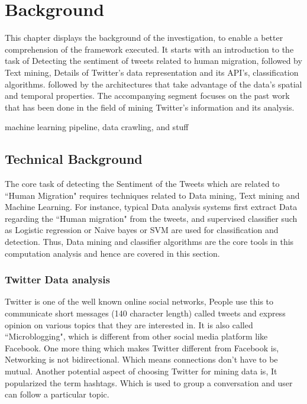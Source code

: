 \chapter{Background}\label{chap:background}
This chapter displays the background of the investigation, to enable a better comprehension of the framework executed. It starts with an introduction to the task of Detecting the sentiment of tweets related to human migration, followed by Text mining, Details of Twitter's data representation and its API's, classification algorithms. followed by the architectures that take advantage of the data’s spatial and temporal properties. The accompanying segment focuses on the past work that has been done in the field of mining Twitter's information and its analysis.

machine learning pipeline, data crawling, and stuff
    
\section{Technical Background}

The core task of detecting the Sentiment of the Tweets which are related to ``Human Migration" requires techniques related to Data mining, Text mining and Machine Learning. For instance, typical Data analysis systems first extract Data regarding the ``Human migration" from the tweets, and supervised classifier such as Logistic regression or Naive bayes or SVM  are used for classification and detection. Thus, Data mining and classifier algorithms are the core tools in this computation analysis and hence are covered in this section.

\subsection{Twitter Data analysis}

Twitter is one of the well known online social networks, People use this to communicate short messages (140 character length) called tweets and express opinion on various topics that they are interested in. It is also called ``Microblogging", which is different from other social media platform like Facebook. One more thing which makes Twitter different from Facebook is, Networking is not bidirectional. Which means connections don't have to be mutual. Another  potential aspect of choosing Twitter for mining data is, It popularized the term hashtags. Which is used to group a  conversation and user can follow a particular topic.

